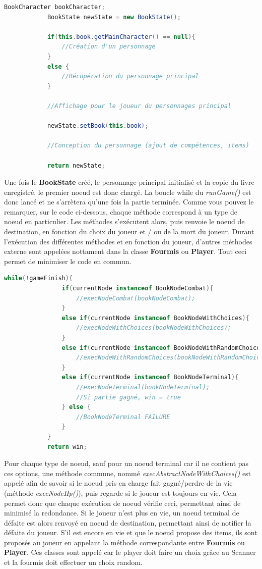 		\begin{lstlisting}[gobble=12, language=java, caption=createNewState()]
			BookCharacter bookCharacter;
			BookState newState = new BookState();

			if(this.book.getMainCharacter() == null){
				//Création d'un personnage
			}
			else {
				//Récupération du personnage principal
			}

			//Affichage pour le joueur du personnages principal

			newState.setBook(this.book);

			//Conception du personnage (ajout de compétences, items)

			return newState;
		\end{lstlisting}

		Une fois le \textbf{BookState} créé, le personnage principal initialisé et la copie du livre enregistré, le premier noeud est donc chargé. La boucle while du \textit{runGame()} est donc lancé et ne s'arrètera qu'une fois la partie terminée. Comme vous pouvez le remarquer, sur le code ci-dessous, chaque méthode correspond à un type de noeud en particulier. Les méthodes s'exécutent alors, puis renvoie le noeud de destination, en fonction du choix du joueur et / ou de la mort du joueur. Durant l'exécution des différentes méthodes et en fonction du joueur, d'autres méthodes externe sont appelées nottament dans la classe \textbf{Fourmis} ou \textbf{Player}. Tout ceci permet de minimiser le code en commun.

		\begin{lstlisting}[gobble=12, language=java, label=lst:runGame, caption=Méthode runGame()]
			while(!gameFinish){
				if(currentNode instanceof BookNodeCombat){
					//execNodeCombat(bookNodeCombat);
				}
				else if(currentNode instanceof BookNodeWithChoices){
					//execNodeWithChoices(bookNodeWithChoices);
				}
				else if(currentNode instanceof BookNodeWithRandomChoices){
					//execNodeWithRandomChoices(bookNodeWithRandomChoices);
				}
				else if(currentNode instanceof BookNodeTerminal){
					//execNodeTerminal(bookNodeTerminal);
					//Si partie gagné, win = true
				} else {
					//BookNodeTerminal FAILURE
				}
			}
			return win;
		\end{lstlisting}

		Pour chaque type de noeud, sauf pour un noeud terminal car il ne contient pas ces options, une méthode commune, nommé \textit{execAbstractNodeWithChoices()} est appelé afin de savoir si le noeud pris en charge fait gagné/perdre de la vie (méthode \textit{execNodeHp()}), puis regarde si le joueur est toujours en vie. Cela permet donc que chaque exécution de noeud vérifie ceci, permettant ainsi de minimisé la redondance. Si le joueur n'est plus en vie, un noeud terminal de défaite est alors renvoyé en noeud de destination, permettant ainsi de notifier la défaite du joueur. S'il est encore en vie et que le noeud propose des items, ils sont proposés au joueur en appelant la méthode correspondante entre \textbf{Fourmis} ou \textbf{Player}. Ces classes sont appelé car le player doit faire un choix grâce au Scanner et la fourmis doit effectuer un choix random.\\


